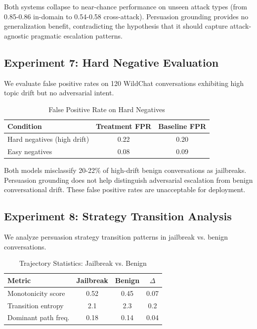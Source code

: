 \documentclass[11pt]{article}
\begin{document}
Both systems collapse to near-chance performance on unseen attack types (from 0.85-0.86 in-domain to 0.54-0.58 cross-attack). Persuasion grounding provides no generalization benefit, contradicting the hypothesis that it should capture attack-agnostic pragmatic escalation patterns.

\subsection{Experiment 7: Hard Negative Evaluation}

We evaluate false positive rates on 120 WildChat conversations exhibiting high topic drift but no adversarial intent.

\begin{table}[h]
\centering
\caption{False Positive Rate on Hard Negatives}
\label{tab:fpr}
\begin{tabular}{lcc}
\toprule
\textbf{Condition} & \textbf{Treatment FPR} & \textbf{Baseline FPR} \\
\midrule
Hard negatives (high drift) & 0.22 & 0.20 \\
Easy negatives & 0.08 & 0.09 \\
\bottomrule
\end{tabular}
\end{table}

Both models misclassify 20-22\% of high-drift benign conversations as jailbreaks. Persuasion grounding does not help distinguish adversarial escalation from benign conversational drift. These false positive rates are unacceptable for deployment.

\subsection{Experiment 8: Strategy Transition Analysis}

We analyze persuasion strategy transition patterns in jailbreak vs. benign conversations.

\begin{table}[h]
\centering
\caption{Trajectory Statistics: Jailbreak vs. Benign}
\label{tab:trajectory}
\begin{tabular}{lccc}
\toprule
\textbf{Metric} & \textbf{Jailbreak} & \textbf{Benign} & \textbf{$\Delta$} \\
\midrule
Monotonicity score & 0.52 & 0.45 & 0.07 \\
Transition entropy & 2.1 & 2.3 & 0.2 \\
Dominant path freq. & 0.18 & 0.14 & 0.04 \\
\bottomrule
\end{tabular}
\end{table}
\end{document}
